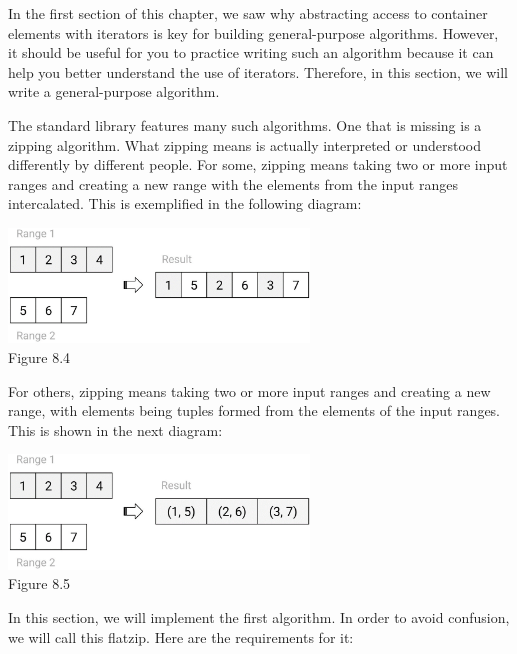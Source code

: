 
In the first section of this chapter, we saw why abstracting access to container elements with iterators is key for building general-purpose algorithms. However, it should be useful for you to practice writing such an algorithm because it can help you better understand the use of iterators. Therefore, in this section, we will write a general-purpose algorithm.

The standard library features many such algorithms. One that is missing is a zipping algorithm. What zipping means is actually interpreted or understood differently by different people. For some, zipping means taking two or more input ranges and creating a new range with the elements from the input ranges intercalated. This is exemplified in the following diagram:

\begin{center}
\includegraphics[width=0.6\textwidth]{content/3/chapter8/images/4.png}\\
Figure 8.4
\end{center}

For others, zipping means taking two or more input ranges and creating a new range, with elements being tuples formed from the elements of the input ranges. This is shown in the next diagram:

\begin{center}
\includegraphics[width=0.6\textwidth]{content/3/chapter8/images/5.png}\\
Figure 8.5
\end{center}

In this section, we will implement the first algorithm. In order to avoid confusion, we will call this flatzip. Here are the requirements for it:

